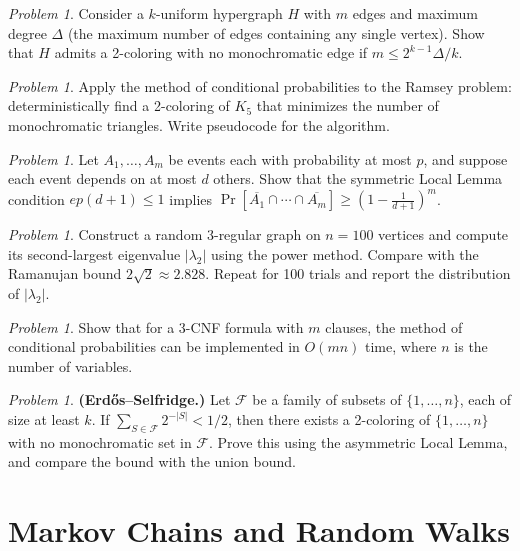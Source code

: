 \documentclass[twoside,12pt]{book}
\theoremstyle{plain}
\theoremstyle{definition}
\theoremstyle{remark}
\newtheorem{problem}[theorem]{Problem}
\begin{document}
\begin{problem}
Consider a $k$-uniform hypergraph $H$ with $m$ edges and maximum degree
$\Delta$ (the maximum number of edges containing any single vertex). Show
that $H$ admits a 2-coloring with no monochromatic edge if $m \leq
2^{k-1} \Delta / k$.
\end{problem}

\begin{problem}
Apply the method of conditional probabilities to the Ramsey problem:
deterministically find a 2-coloring of $K_5$ that minimizes the number
of monochromatic triangles. Write pseudocode for the algorithm.
\end{problem}

\begin{problem}
Let $A_1, \ldots, A_m$ be events each with probability at most $p$, and
suppose each event depends on at most $d$ others. Show that the symmetric
Local Lemma condition $ep(d+1) \leq 1$ implies
$\Pr[\overline{A_1} \cap \cdots \cap \overline{A_m}] \geq
\left(1 - \frac{1}{d+1}\right)^m$.
\end{problem}

\begin{problem}
Construct a random $3$-regular graph on $n = 100$ vertices and compute
its second-largest eigenvalue $|\lambda_2|$ using the power method.
Compare with the Ramanujan bound $2\sqrt{2} \approx 2.828$. Repeat for
100 trials and report the distribution of $|\lambda_2|$.
\end{problem}

\begin{problem}
Show that for a 3-CNF formula with $m$ clauses, the method of conditional
probabilities can be implemented in $O(mn)$ time, where $n$ is the number
of variables.
\end{problem}

\begin{problem}
\textbf{(Erd\H{o}s--Selfridge.)} Let $\mathcal{F}$ be a family of subsets
of $\{1, \ldots, n\}$, each of size at least $k$. If $\sum_{S \in
\mathcal{F}} 2^{-|S|} < 1/2$, then there exists a 2-coloring of
$\{1, \ldots, n\}$ with no monochromatic set in $\mathcal{F}$. Prove this
using the asymmetric Local Lemma, and compare the bound with the union
bound.
\end{problem}


\chapter{Markov Chains and Random Walks}
\label{ch:markov-chains}
\end{document}
